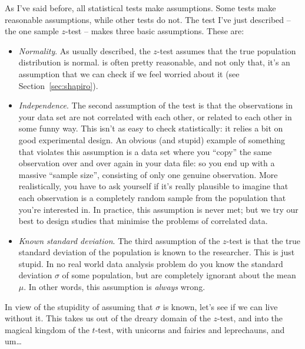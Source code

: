  

As I've said before, all statistical tests make assumptions. Some tests make reasonable assumptions, while other tests do not. The test I've just described -- the one sample $z$-test -- makes three basic assumptions.  These are:
\begin{itemize}
\item {\it Normality}. As usually described, the $z$-test assumes that the true population distribution is normal. is often pretty reasonable, and not only that, it's an assumption that we can check if we feel worried about it (see Section~\ref{sec:shapiro}). 
\item {\it Independence}. The second assumption of the test is that the observations in your data set are not correlated with each other, or related to each other in some funny way. This isn't as easy to check statistically: it relies a bit on good experimental design. An obvious (and stupid) example of something that violates this assumption is a data set where you ``copy'' the same observation over and over again in your data file: so you end up with a massive ``sample size'', consisting of only one genuine observation. More realistically, you have to ask yourself if it's really plausible to imagine that each observation is a completely random sample from the population that you're interested in. In practice, this assumption is never met; but we try our best to design studies that minimise the problems of correlated data. 
\item {\it Known standard deviation}. The third assumption of the $z$-test is that the true standard deviation of the population is known to the researcher. This is just stupid. In no real world data analysis problem do you know the standard deviation $\sigma$ of some population, but are completely ignorant about the mean $\mu$. In other words, this assumption is {\it always} wrong. 
\end{itemize}
In view of the stupidity of assuming that $\sigma$ is known, let's see if we can live without it. This takes us out of the dreary domain of the $z$-test, and into the magical kingdom of the $t$-test, with unicorns and fairies and leprechauns, and um\ldots


